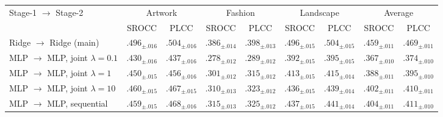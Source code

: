 \begin{tabular}{@{}l cc cc cc cc@{}}
\toprule
\multirow{2}{*}{Stage-1 $\to$ Stage-2} & \multicolumn{2}{c}{Artwork} & \multicolumn{2}{c}{Fashion} & \multicolumn{2}{c}{Landscape} & \multicolumn{2}{c}{Average} \\
\cmidrule(lr){2-3}\cmidrule(lr){4-5}\cmidrule(lr){6-7}\cmidrule(lr){8-9}
& SROCC & PLCC & SROCC & PLCC & SROCC & PLCC & SROCC & PLCC \\
\midrule
Ridge $\to$ Ridge (main) & $\bm{.496_{\pm .016}}$ & $\bm{.504_{\pm .016}}$ & $\bm{.386_{\pm .014}}$ & $\bm{.398_{\pm .013}}$ & $\bm{.496_{\pm .015}}$ & $\bm{.504_{\pm .015}}$ & $\bm{.459_{\pm .011}}$ & $\bm{.469_{\pm .011}}$ \\
\addlinespace
MLP $\to$ MLP, joint $\lambda=0.1$ & $.430_{\pm .016}$ & $.437_{\pm .016}$ & $.278_{\pm .012}$ & $.289_{\pm .012}$ & $.392_{\pm .015}$ & $.395_{\pm .015}$ & $.367_{\pm .010}$ & $.374_{\pm .010}$ \\
MLP $\to$ MLP, joint $\lambda=1$ & $.450_{\pm .015}$ & $.456_{\pm .016}$ & $.301_{\pm .012}$ & $.315_{\pm .012}$ & $.413_{\pm .015}$ & $.415_{\pm .014}$ & $.388_{\pm .011}$ & $.395_{\pm .010}$ \\
MLP $\to$ MLP, joint $\lambda=10$ & $.460_{\pm .015}$ & $.467_{\pm .015}$ & $.310_{\pm .013}$ & $.323_{\pm .012}$ & $.436_{\pm .015}$ & $.439_{\pm .014}$ & $.402_{\pm .011}$ & $.410_{\pm .011}$ \\
\addlinespace
MLP $\to$ MLP, sequential & $.459_{\pm .015}$ & $.468_{\pm .016}$ & $.315_{\pm .013}$ & $.325_{\pm .012}$ & $.437_{\pm .015}$ & $.441_{\pm .014}$ & $.404_{\pm .011}$ & $.411_{\pm .010}$ \\
\bottomrule
\end{tabular}

